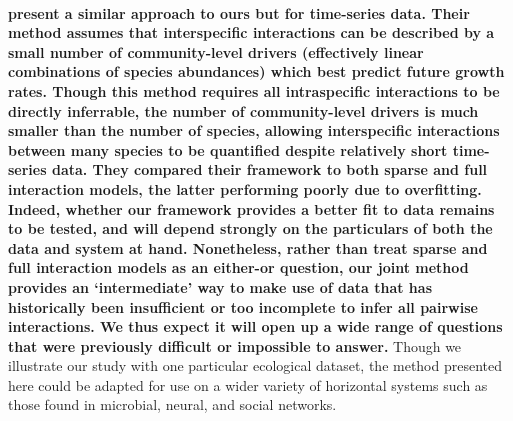 \documentclass[a4,12pt]{article}
\begin{document}
\begin{refsection}
    \paragraph{}
    \textbf{\textcite{Ovaskainen2017} present a similar approach to ours but for time-series data. Their method assumes that interspecific interactions can be described by a small number of community-level drivers (effectively linear combinations of species abundances) which best predict future growth rates. Though this method requires all intraspecific interactions to be directly inferrable, the number of community-level drivers is much smaller than the number of species, allowing interspecific interactions between many species to be quantified despite relatively short time-series data. They compared their framework to both sparse and full interaction models, the latter performing poorly due to overfitting. Indeed, whether our framework provides a better fit to data remains to be tested, and will depend strongly on the particulars of both the data and system at hand. Nonetheless, rather than treat sparse and full interaction models as an either-or question, our joint method provides an `intermediate' way to make use of data that has historically been insufficient or too incomplete to infer all pairwise interactions. We thus expect it will open up a wide range of questions that were previously difficult or impossible to answer.} Though we illustrate our study with one particular ecological dataset, the method presented here could be adapted for use on a wider variety of horizontal systems such as those found in microbial, neural, and social networks. 



\end{refsection}
\end{document}
